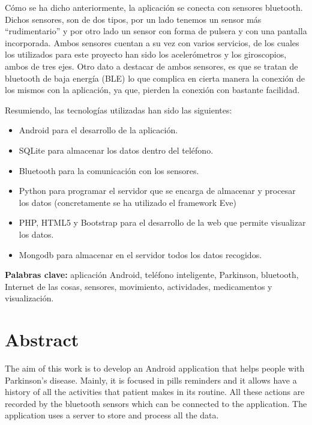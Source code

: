 \documentclass[11pt,spanish]{article}
\begin{document}
Cómo se ha dicho anteriormente, la aplicación se conecta con sensores bluetooth. Dichos sensores, son de dos tipos, por un lado tenemos un sensor más “rudimentario” y por otro lado un sensor con forma de pulsera y con una pantalla incorporada. Ambos sensores cuentan a su vez con varios servicios, de los cuales los utilizados para este proyecto han sido los acelerómetros y los giroscopios, ambos de tres ejes. Otro dato a destacar de ambos sensores, es que se tratan de bluetooth de baja energía (BLE) lo que complica en cierta manera la conexión de los mismos con la aplicación, ya que, pierden la conexión con bastante facilidad.
\newline

Resumiendo, las tecnologías utilizadas han sido las siguientes:

\begin{itemize}
    \item Android para el desarrollo de la aplicación. 
	\item SQLite para almacenar los datos dentro del teléfono. 
	\item Bluetooth para la comunicación con los sensores. 
	\item Python para programar el servidor que se encarga de almacenar y procesar los datos (concretamente se ha utilizado el framework Eve)
    \item PHP, HTML5 y Bootstrap para el desarrollo de la web que permite visualizar los datos.
	\item Mongodb para almacenar en el servidor todos los datos recogidos.
    \newline
\end{itemize}

{\bf Palabras clave:} aplicación Android, teléfono inteligente, Parkinson, bluetooth, Internet de las cosas, sensores, movimiento, actividades, medicamentos y visualización.
\newpage

\section*{Abstract}
The aim of this work is to develop an Android application that helps people with Parkinson's disease. Mainly, it is focused in pills reminders and it allows have a history of all the activities that patient makes in its routine. All these actions are recorded by the bluetooth sensors which can be connected to the application. The application uses a server to store and process all the data.
\newline
\end{document}
